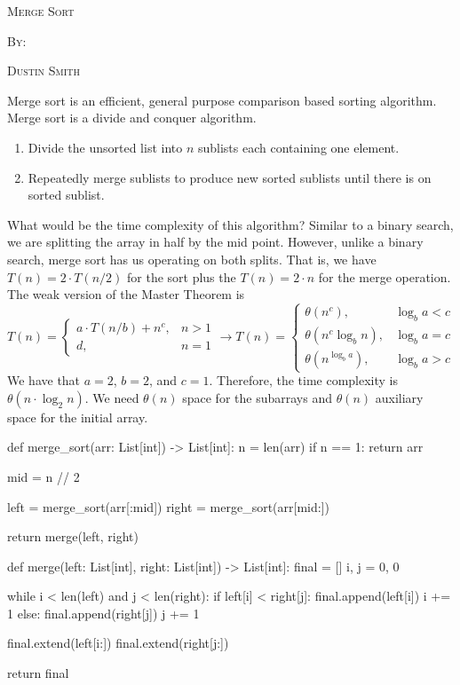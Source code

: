 \documentclass[12pt,dvipsnames,svgnames,x11names]{article}
\begin{document}
%
\pagecolor{gray!50}
\begin{center}
  \begin{center}
  \vspace*{\fill}
  \textsc{\LARGE Merge Sort}
  \par\bigskip
  \textsc{By:}
  \par\bigskip
  \textsc{\LARGE Dustin Smith}
  \vspace*{\fill}
\end{center}
\end{center}

\newpage

Merge sort is an efficient, general purpose comparison based sorting algorithm. Merge sort is a divide
and conquer algorithm.
\begin{enumerate}
	\item Divide the unsorted list into \(n\) sublists each containing one element.
	\item Repeatedly merge sublists to produce new sorted sublists until there is on sorted sublist.
\end{enumerate}
What would be the time complexity of this algorithm? Similar to a binary search, we are splitting the 
array in half by the mid point. However, unlike a binary search, merge sort has us operating on both splits.
That is, we have \(T(n) = 2\cdot T(n / 2)\) for the sort plus the \(T(n) = 2\cdot n\) for the merge operation. 
The weak version of the Master Theorem is
\[
	T(n) =
	\begin{cases}
		a\cdot T(n / b) + n^c, & n > 1\\
		d, & n = 1
	\end{cases} \rightarrow
	T(n) = 
	\begin{cases}
		\theta(n^c), & \log_b a < c\\
		\theta(n^c\log_b n), & \log_b a = c\\
		\theta(n^{\log_b a}), & \log_b a > c
	\end{cases}
\]
We have that \(a = 2\), \(b = 2\), and \(c = 1\). Therefore, the time complexity is \(\theta(n\cdot\log_2 n)\).
We need \(\theta(n)\) space for the subarrays and \(\theta(n)\) auxiliary space for the initial array.
\begin{python}
def merge_sort(arr: List[int]) -> List[int]:
  n = len(arr)
  if n == 1:
    return arr
    
  mid = n // 2
  
  left = merge_sort(arr[:mid])
  right = merge_sort(arr[mid:])
  
  return merge(left, right)
  
  
def merge(left: List[int], right: List[int]) -> List[int]:
  final = []
  i, j = 0, 0
  
  while i < len(left) and j < len(right):
    if left[i] < right[j]:
      final.append(left[i])
      i += 1
    else:
      final.append(right[j])
      j += 1
      
  final.extend(left[i:])
  final.extend(right[j:])
  
  return final
\end{python}
\end{document}
